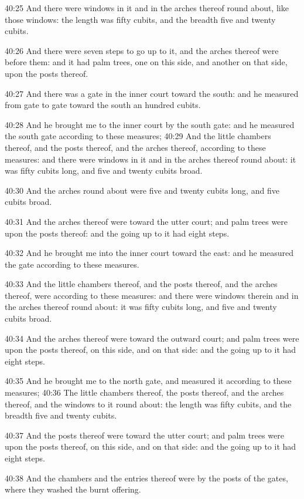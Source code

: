 40:25 And there were windows in it and in the arches thereof round about, like those windows: the length was fifty cubits, and the breadth five and twenty cubits.

40:26 And there were seven steps to go up to it, and the arches thereof were before them: and it had palm trees, one on this side, and another on that side, upon the posts thereof.

40:27 And there was a gate in the inner court toward the south: and he measured from gate to gate toward the south an hundred cubits.

40:28 And he brought me to the inner court by the south gate: and he measured the south gate according to these measures; 40:29 And the little chambers thereof, and the posts thereof, and the arches thereof, according to these measures: and there were windows in it and in the arches thereof round about: it was fifty cubits long, and five and twenty cubits broad.

40:30 And the arches round about were five and twenty cubits long, and five cubits broad.

40:31 And the arches thereof were toward the utter court; and palm trees were upon the posts thereof: and the going up to it had eight steps.

40:32 And he brought me into the inner court toward the east: and he measured the gate according to these measures.

40:33 And the little chambers thereof, and the posts thereof, and the arches thereof, were according to these measures: and there were windows therein and in the arches thereof round about: it was fifty cubits long, and five and twenty cubits broad.

40:34 And the arches thereof were toward the outward court; and palm trees were upon the posts thereof, on this side, and on that side: and the going up to it had eight steps.

40:35 And he brought me to the north gate, and measured it according to these measures; 40:36 The little chambers thereof, the posts thereof, and the arches thereof, and the windows to it round about: the length was fifty cubits, and the breadth five and twenty cubits.

40:37 And the posts thereof were toward the utter court; and palm trees were upon the posts thereof, on this side, and on that side: and the going up to it had eight steps.

40:38 And the chambers and the entries thereof were by the posts of the gates, where they washed the burnt offering.

